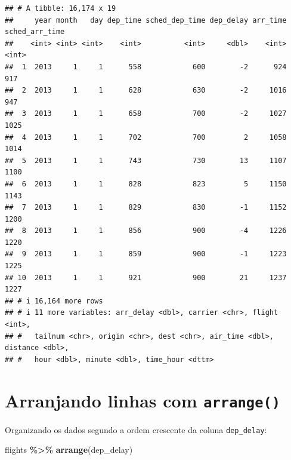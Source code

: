\documentclass[
]{book}
\newenvironment{Shaded}{\begin{snugshade}}{\end{snugshade}}
\newcommand{\FunctionTok}[1]{\textcolor[rgb]{0.13,0.29,0.53}{\textbf{#1}}}
\newcommand{\NormalTok}[1]{#1}
\newcommand{\SpecialCharTok}[1]{\textcolor[rgb]{0.81,0.36,0.00}{\textbf{#1}}}
\begin{document}
\begin{verbatim}
## # A tibble: 16,174 x 19
##     year month   day dep_time sched_dep_time dep_delay arr_time sched_arr_time
##    <int> <int> <int>    <int>          <int>     <dbl>    <int>          <int>
##  1  2013     1     1      558            600        -2      924            917
##  2  2013     1     1      628            630        -2     1016            947
##  3  2013     1     1      658            700        -2     1027           1025
##  4  2013     1     1      702            700         2     1058           1014
##  5  2013     1     1      743            730        13     1107           1100
##  6  2013     1     1      828            823         5     1150           1143
##  7  2013     1     1      829            830        -1     1152           1200
##  8  2013     1     1      856            900        -4     1226           1220
##  9  2013     1     1      859            900        -1     1223           1225
## 10  2013     1     1      921            900        21     1237           1227
## # i 16,164 more rows
## # i 11 more variables: arr_delay <dbl>, carrier <chr>, flight <int>,
## #   tailnum <chr>, origin <chr>, dest <chr>, air_time <dbl>, distance <dbl>,
## #   hour <dbl>, minute <dbl>, time_hour <dttm>
\end{verbatim}

\newpage

\section{\texorpdfstring{Arranjando linhas com \texttt{arrange()}}{Arranjando linhas com arrange()}}\label{arranjando-linhas-com-arrange}

Organizando os dados segundo a ordem crescente da coluna \texttt{dep\_delay}:

\begin{Shaded}
\begin{Highlighting}[]
\NormalTok{flights }\SpecialCharTok{\%\textgreater{}\%} \FunctionTok{arrange}\NormalTok{(dep\_delay)}
\end{Highlighting}
\end{Shaded}
\end{document}
